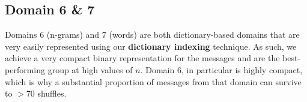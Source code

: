 \documentclass[titlepage]{article}
\begin{document}
\subsection{Domain 6 \& 7}

Domains 6 (n-grams) and 7 (words) are both dictionary-based domains that are very easily represented using our \textbf{dictionary indexing} technique. As such, we achieve a very compact binary representation for the messages and are the best-performing group at high values of $n$. Domain 6, in particular is highly compact, which is why a substantial proportion of messages from that domain can survive to $> 70$ shuffles.
\end{document}
